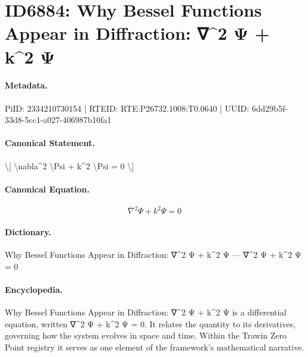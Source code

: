 \section*{ID6884: Why Bessel Functions Appear in Diffraction: ∇\textasciicircum{}2 Ψ + k\textasciicircum{}2 Ψ}
\paragraph{Metadata.}
PiID: 2334210730154 | RTEID: RTE:P26732.1008:T0.0640 | UUID: 6dd29b5f-33d8-5cc1-a027-406987b10fa1

\paragraph{Canonical Statement.}
\textbackslash{}[ \textbackslash{}nabla\textasciicircum{}2 \textbackslash{}Psi + k\textasciicircum{}2 \textbackslash{}Psi = 0 \textbackslash{}]

\paragraph{Canonical Equation.}
\[
\nabla^2 \Psi + k^2 \Psi = 0
\]

\paragraph{Dictionary.}
Why Bessel Functions Appear in Diffraction: ∇\textasciicircum{}2 Ψ + k\textasciicircum{}2 Ψ — ∇\textasciicircum{}2 Ψ + k\textasciicircum{}2 Ψ = 0

\paragraph{Encyclopedia.}
Why Bessel Functions Appear in Diffraction: ∇\textasciicircum{}2 Ψ + k\textasciicircum{}2 Ψ is a differential equation, written ∇\textasciicircum{}2 Ψ + k\textasciicircum{}2 Ψ = 0. It relates the quantity to its derivatives, governing how the system evolves in space and time. Within the Trawin Zero Point registry it serves as one element of the framework's mathematical narrative.
